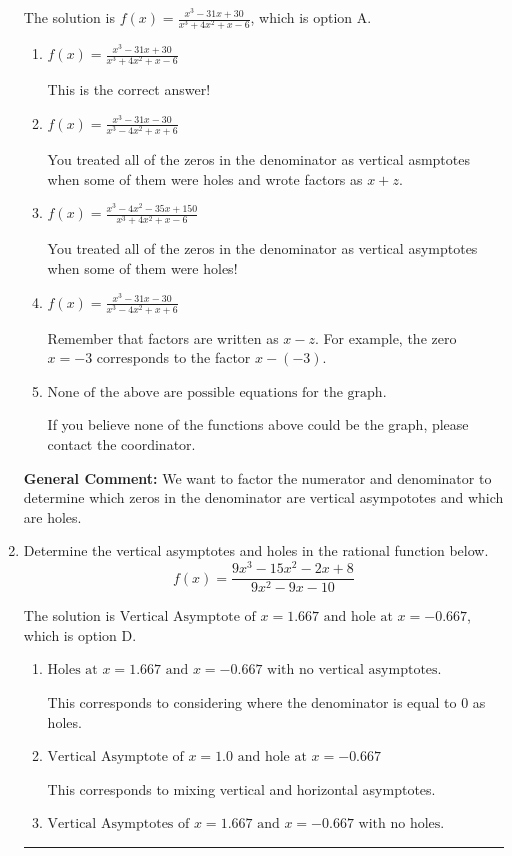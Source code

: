 \documentclass{extbook}[14pt]
\newcommand{\litem}[1]{\item #1

\rule{\textwidth}{0.4pt}}
\begin{document}
\begin{enumerate}
{The solution is \( f(x)=\frac{x^{3} -31 x + 30}{x^{3} +4 x^{2} +x -6} \), which is option A.\begin{enumerate}[label=\Alph*.]
\item \( f(x)=\frac{x^{3} -31 x + 30}{x^{3} +4 x^{2} +x -6} \)

This is the correct answer!
\item \( f(x)=\frac{x^{3} -31 x -30}{x^{3} -4 x^{2} +x + 6} \)

You treated all of the zeros in the denominator as vertical asmptotes when some of them were holes and wrote factors as $x+z$.
\item \( f(x)=\frac{x^{3} -4 x^{2} -35 x + 150}{x^{3} +4 x^{2} +x -6} \)

You treated all of the zeros in the denominator as vertical asymptotes when some of them were holes!
\item \( f(x)=\frac{x^{3} -31 x -30}{x^{3} -4 x^{2} +x + 6} \)

Remember that factors are written as $x-z$. For example, the zero $x=-3$ corresponds to the factor $x-(-3)$.
\item \( \text{None of the above are possible equations for the graph.} \)

If you believe none of the functions above could be the graph, please contact the coordinator.
\end{enumerate}

\textbf{General Comment:} We want to factor the numerator and denominator to determine which zeros in the denominator are vertical asympototes and which are holes.
}
\litem{
Determine the vertical asymptotes and holes in the rational function below.
\[ f(x) = \frac{9x^{3} -15 x^{2} -2 x + 8}{9x^{2} -9 x -10} \]

The solution is \( \text{Vertical Asymptote of } x = 1.667 \text{ and hole at } x = -0.667 \), which is option D.\begin{enumerate}[label=\Alph*.]
\item \( \text{Holes at } x = 1.667 \text{ and } x = -0.667 \text{ with no vertical asymptotes.} \)

This corresponds to considering where the denominator is equal to 0 as holes.
\item \( \text{Vertical Asymptote of } x = 1.0 \text{ and hole at } x = -0.667 \)

This corresponds to mixing vertical and horizontal asymptotes.
\item \( \text{Vertical Asymptotes of } x = 1.667 \text{ and } x = -0.667 \text{ with no holes.} \)


\end{enumerate}}
\end{enumerate}
\end{document}
